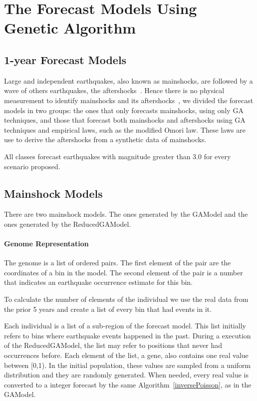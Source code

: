 \section{The Forecast Models Using Genetic Algorithm}\label{Models}


\subsection{1-year Forecast Models}
Large and independent earthquakes, also known as mainshocks, are
followed by a wave of others earthquakes, the
aftershocks~\cite{schorlemmer2010first}. Hence there is no physical
measurement to identify mainshocks and its
aftershocks~\cite{schorlemmer2010first}, we divided the forecast
models in two groups: the ones that only forecasts mainshocks, using only GA techniques, 
and those that forecast both mainshocks and aftershocks using GA techniques and 
empirical laws, such as the modified Omori law. These laws are use to derive the 
aftershocks from a synthetic data of mainshocks. 

All classes forecast earthquakes with magnitude greater than 3.0 for every scenario proposed.

\subsection{Mainshock Models}\label{mainshocksMethods}
There are two mainshock models. The ones generated by the GAModel and 
the ones generated by the ReducedGAModel.



\paragraph{\textbf{Genome Representation}}\label{genomeReduced}
The genome is a list of ordered pairs. The first element of the pair are the coordinates of a bin in the model. The second element of the pair is a number that indicates an earthquake occurrence estimate for this bin.

To calculate the number of elements of the individual we use the real data from the prior 5 years and create a list of every bin that had events in it.

Each individual is a list of a sub-region of the forecast model. This list initially refers to bins where earthquake events happened in the past. During a execution of the ReducedGAModel, the list may refer to positions that never had occurrences before. Each element of the list, a gene, also contains one real value between [0,1). In the initial population, these values are sampled from a uniform distribution and they are randomly generated. When needed, every real value is converted to a integer forecast by the same Algorithm~\ref{inversePoisson}, as in the GAModel.


